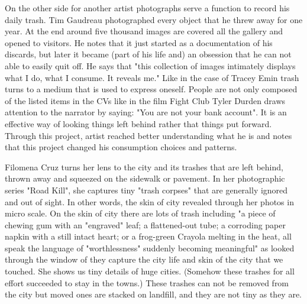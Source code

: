 On the other side for another artist photographs serve a function to record his daily trash. Tim Gaudreau photographed every object that he threw away for one year. At the end around five thousand images are covered all the gallery and opened to visitors. He notes that it just started as a documentation of his discards, but later it became (part of his life and) an obsession that he can not able to easily quit off. He says that "this collection of images intimately displays what I do, what I consume. It reveals me." Like in the case of Tracey Emin trash turns to a medium that is used to express oneself. People are not only composed of the listed items in the CVs like in the film Fight Club Tyler Durden draws attention to the narrator by saying: "You are not your bank account". It is an effective way of looking things left behind rather that things put forward. Through this project, artist reached better understanding what he is and notes that this project changed his consumption choices and patterns.


Filomena Cruz turns her lens to the city and its trashes that are left behind, thrown away and squeezed on the sidewalk or pavement. In her photographic series "Road Kill", she captures tiny "trash corpses" that are generally ignored and out of sight. In other words, the skin of city revealed through her photos in micro scale. On the skin of city there are lots of trash including "a piece of chewing gum with an "engraved" leaf; a flattened-out tube; a corroding paper napkin with a still intact heart; or a frog-green Crayola melting in the heat, all speak the language of "worthlessness" suddenly becoming meaningful" as looked through the window of they capture the city life and skin of the city that we touched. She shows us tiny details of huge cities. (Somehow these trashes for all effort succeeded to stay in the towns.) These trashes can not be removed from the city but moved ones are stacked on landfill, and they are not tiny as they are.


